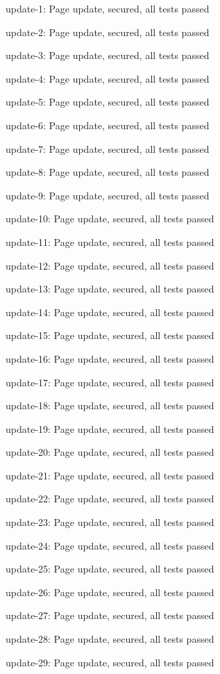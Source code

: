 update-1: Page update, secured, all tests passed

update-2: Page update, secured, all tests passed

update-3: Page update, secured, all tests passed

update-4: Page update, secured, all tests passed

update-5: Page update, secured, all tests passed

update-6: Page update, secured, all tests passed

update-7: Page update, secured, all tests passed

update-8: Page update, secured, all tests passed

update-9: Page update, secured, all tests passed

update-10: Page update, secured, all tests passed

update-11: Page update, secured, all tests passed

update-12: Page update, secured, all tests passed

update-13: Page update, secured, all tests passed

update-14: Page update, secured, all tests passed

update-15: Page update, secured, all tests passed

update-16: Page update, secured, all tests passed

update-17: Page update, secured, all tests passed

update-18: Page update, secured, all tests passed

update-19: Page update, secured, all tests passed

update-20: Page update, secured, all tests passed

update-21: Page update, secured, all tests passed

update-22: Page update, secured, all tests passed

update-23: Page update, secured, all tests passed

update-24: Page update, secured, all tests passed

update-25: Page update, secured, all tests passed

update-26: Page update, secured, all tests passed

update-27: Page update, secured, all tests passed

update-28: Page update, secured, all tests passed

update-29: Page update, secured, all tests passed

